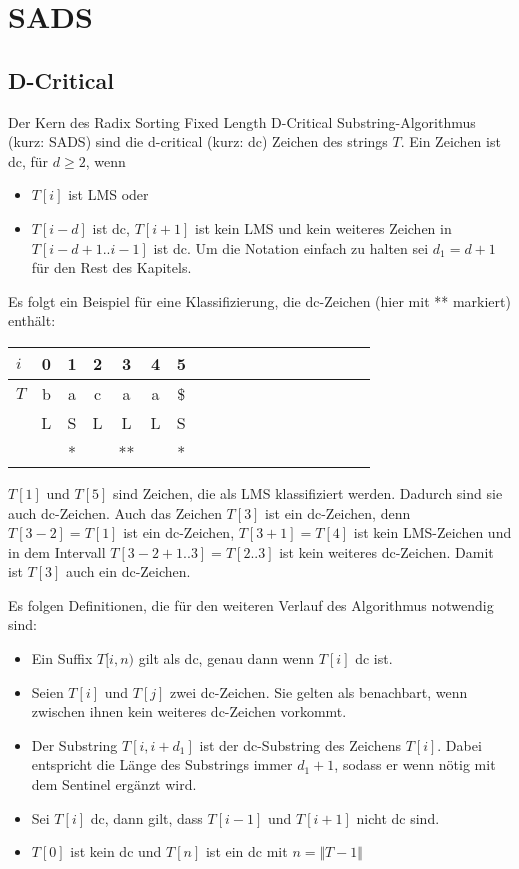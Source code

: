 \section{SADS}
\subsection{D-Critical}
\label{dc}


Der  Kern des Radix Sorting Fixed Length D-Critical Substring-Algorithmus\cite[ch.~4.1]{saca:6} (kurz: SADS) sind die d-critical (kurz: dc) Zeichen des strings $T$. Ein Zeichen ist dc, für $d \geq 2$, wenn
\begin{itemize}
    \item $T[i]$ ist LMS oder
    \item $T[i-d]$ ist dc, $T[i+1]$ ist kein LMS und kein weiteres Zeichen in $T[i-d+1..i-1]$ ist dc. Um die Notation einfach zu halten sei $d_1=d+1$ für den Rest des Kapitels.
\end{itemize}

\noindent Es folgt ein Beispiel für eine Klassifizierung, die dc-Zeichen (hier mit ** markiert) enthält:

\begin{center}
  \begin{tabular}{ | l | c | c| c| c| c| c| c| c| c| c| c| c| c| c| c| c| c | }
    \hline
        $i$ & 0 & 1 & 2 & 3 & 4 & 5 \\ \hline
        $T$ & b & a & c & a & a & \$ \\ \hline
        $ $ & L & S & L & L & L & S \\ \hline
      	$ $ & & * & & ** & & * \\
    \hline
  \end{tabular}
\end{center}
\bigskip

\noindent $T[1]$ und $T[5]$ sind Zeichen, die als LMS klassifiziert werden. Dadurch sind sie auch dc-Zeichen. Auch das Zeichen $T[3]$ ist ein dc-Zeichen, denn $T[3 - 2] = T[1]$ ist ein dc-Zeichen, $T[3 + 1] = T[4]$ ist kein LMS-Zeichen und in dem Intervall $T[3-2+1..3] = T[2..3]$ ist kein weiteres dc-Zeichen. Damit ist $T[3]$ auch ein dc-Zeichen.

\bigskip
\noindent Es folgen Definitionen, die für den weiteren Verlauf des Algorithmus notwendig sind:
\begin{itemize}
    \item   Ein Suffix $T[i,n)$ gilt als dc, genau dann wenn $T[i]$ dc ist.
    \item   Seien $T[i]$ und $T[j]$ zwei dc-Zeichen. Sie gelten als benachbart, wenn zwischen ihnen kein weiteres dc-Zeichen vorkommt.
    \item   Der Substring $T[i, i+d_1]$ ist der dc-Substring des Zeichens $T[i]$. Dabei entspricht die Länge des Substrings immer $d_1+1$, sodass er wenn nötig mit dem Sentinel ergänzt wird.
    \item   Sei $T[i]$ dc, dann gilt, dass $T[i-1]$ und $T[i+1]$ nicht dc sind.
    \item   $T[0]$ ist kein dc und $T[n]$ ist ein dc mit $n=\Vert T-1 \Vert$
\end{itemize}
